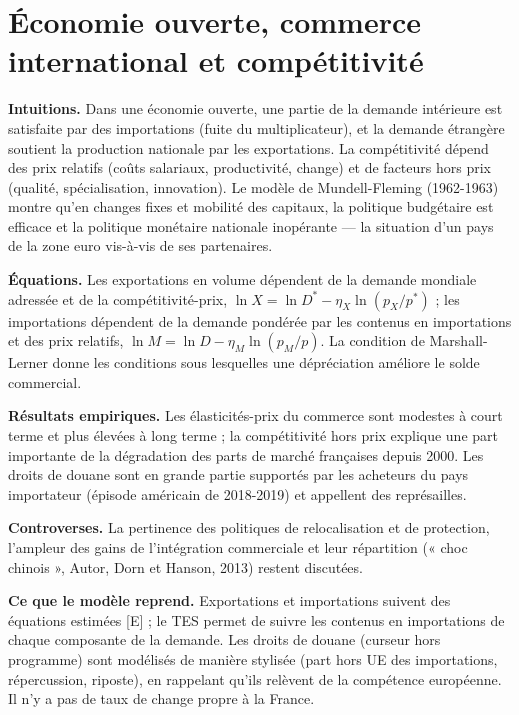 \documentclass[
  11pt,
  11pt,
  a4paper,
  openany]{book}
\begin{document}
\hypertarget{sec:ouverte}{%
\section{Économie ouverte, commerce international et
compétitivité}\label{sec:ouverte}}

\textbf{Intuitions.} Dans une économie ouverte, une partie de la demande
intérieure est satisfaite par des importations (fuite du
multiplicateur), et la demande étrangère soutient la production
nationale par les exportations. La compétitivité dépend des prix
relatifs (coûts salariaux, productivité, change) et de facteurs hors
prix (qualité, spécialisation, innovation). Le modèle de Mundell-Fleming
(1962-1963) montre qu'en changes fixes et mobilité des capitaux, la
politique budgétaire est efficace et la politique monétaire nationale
inopérante --- la situation d'un pays de la zone euro vis-à-vis de ses
partenaires.

\textbf{Équations.} Les exportations en volume dépendent de la demande
mondiale adressée et de la compétitivité-prix,
\(\ln X = \ln D^* - \eta_X \ln (p_X / p^*)\) ; les importations
dépendent de la demande pondérée par les contenus en importations et des
prix relatifs, \(\ln M = \ln D - \eta_M \ln(p_M / p)\). La condition de
Marshall-Lerner donne les conditions sous lesquelles une dépréciation
améliore le solde commercial.

\textbf{Résultats empiriques.} Les élasticités-prix du commerce sont
modestes à court terme et plus élevées à long terme ; la compétitivité
hors prix explique une part importante de la dégradation des parts de
marché françaises depuis 2000. Les droits de douane sont en grande
partie supportés par les acheteurs du pays importateur (épisode
américain de 2018-2019) et appellent des représailles.

\textbf{Controverses.} La pertinence des politiques de relocalisation et
de protection, l'ampleur des gains de l'intégration commerciale et leur
répartition (« choc chinois », Autor, Dorn et Hanson, 2013) restent
discutées.

\textbf{Ce que le modèle reprend.} Exportations et importations suivent
des équations estimées {[}E{]} ; le TES permet de suivre les contenus en
importations de chaque composante de la demande. Les droits de douane
(curseur hors programme) sont modélisés de manière stylisée (part hors
UE des importations, répercussion, riposte), en rappelant qu'ils
relèvent de la compétence européenne. Il n'y a pas de taux de change
propre à la France.
\end{document}

